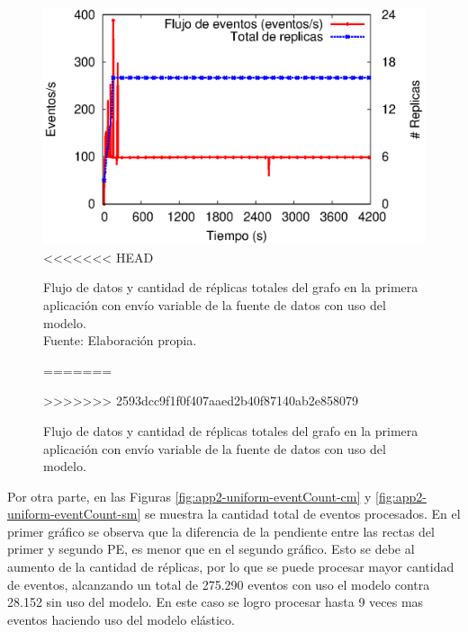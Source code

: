 \begin{figure}[!ht]
	\centering
	\captionsetup{justification=centering}
	\includegraphics[scale=0.7]{images/exp/app2/uniform/cm/processSystem.eps}
<<<<<<< HEAD
    \caption[Flujo de datos y cantidad de réplicas totales del grafo en la primera aplicación con envío variable de la fuente de datos con uso del modelo.]{Flujo de datos y cantidad de réplicas totales del grafo en la primera aplicación con envío variable de la fuente de datos con uso del modelo.\\Fuente: Elaboración propia.}
=======
    \caption{Flujo de datos y cantidad de r\'eplicas totales del grafo en la primera aplicaci\'on con env\'io variable de la fuente de datos con uso del modelo.}
>>>>>>> 2593dcc9f1f0f407aaed2b40f87140ab2e858079
	\label{fig:app2-uniform-processSystem-cm}
\end{figure}



Por otra parte, en las Figuras \ref{fig:app2-uniform-eventCount-cm} y \ref{fig:app2-uniform-eventCount-sm} se muestra la cantidad total de eventos procesados. En el primer gr\'afico se observa que la diferencia de la pendiente entre las rectas del primer y segundo PE, es menor que en el segundo gr\'afico. Esto se debe al aumento de la cantidad de r\'eplicas, por lo que se puede procesar mayor cantidad de eventos, alcanzando un total de 275.290 eventos con uso el modelo contra 28.152 sin uso del modelo. En este caso se logro procesar hasta 9 veces mas eventos haciendo uso del modelo el\'astico.

